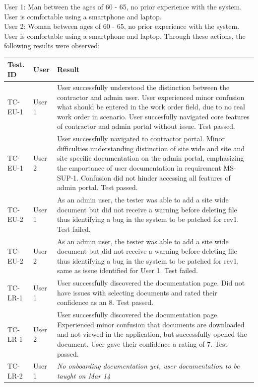 \documentclass[12pt, titlepage]{article}
\begin{document}
User 1: Man between the ages of 60 - 65, no prior experience with the
system. User is comfortable using a smartphone and laptop.\\
User 2: Woman between ages of 60 - 65, no prior experience with the
system. User is comfortable using a smartphone and laptop.
Through these actions, the following results were observed:\\
\begin{longtable}{|m{2cm}|m{1.5cm}|m{9cm}|}
  \hline
  \textbf{Test. ID}  & \textbf{User} & \textbf{Result} \\
  \hline
  TC-EU-1 & User 1& User successfully understood the distinction
  between the contractor and admin user. User experienced minor
  confusion what should be entered in the work order field, due to no
  real work order in scenario. User succesfully navigated core
  features of contractor
  and admin portal without issue. Test passed.\\
  \hline
  TC-EU-1 & User 2& User successfully navigated to contractor portal.
  Minor difficulties understanding distinction of site wide and
  site and site specific documentation on the admin portal,
  emphasizing the emportance of user documentation in requirement MS-SUP-1.
  Confusion did not hinder accessing all features of admin portal.
  Test passed.\\
  \hline
  TC-EU-2 & User 1& As an admin user, the tester was able to add a
  site wide document but did not receive a warning before deleting file
  thus identifying a bug in the system to be patched for rev1. Test failed.\\
  \hline
  TC-EU-2 & User 2& As an admin user, the tester was able to add a
  site wide document but did not receive a warning before deleting file
  thus identifying a bug in the system to be patched for rev1, same
  as issue identified for User 1. Test failed.\\
  \hline
  TC-LR-1 & User 1& User successfully discovered the documentation
  page. Did not have issues with selecting documents and
  rated their confidence as an 8. Test passed. \\
  \hline
  TC-LR-1& User 2& User successfully discovered the documentation
  page. Experienced minor confusion that documents are downloaded
  and not viewed in the application, but successfully opened the
  document. User gave their confidence a rating of 7. Test passed.\\
  \hline
  TC-LR-2 & User 1 & \textit{No onboarding documentation yet, user
  documentation to be taught on Mar 14} \\

\end{longtable}
\end{document}
